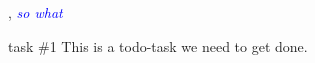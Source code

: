 \documentclass[BSP,english,oneside]{gucthesis}
\newcommand{\comment}[1]{\textcolor{blue}{\emph{#1}}}
\newcommand{\todo}[1]{{\color{green}#1}}
\begin{document}


\makefrontpages



\tableofcontents
\listoffigures
\listoftables












\appendix %



\GUC, 
\comment{so what}

\todo{task \#1}
This is a todo-task we need to get done.
\end{document}
